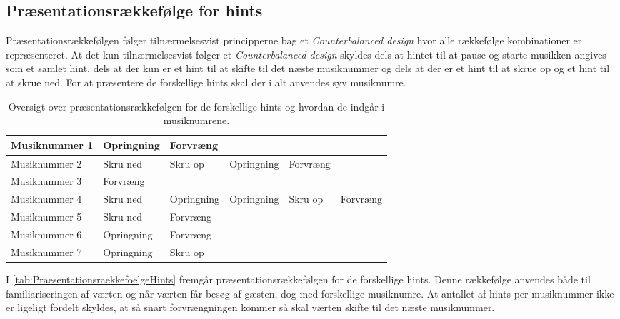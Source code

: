 \subsection{Præsentationsrækkefølge for hints}
\label{PraesentationsraekkefoelgeSocialAccept}
%
Præsentationsrækkefølgen følger tilnærmelsesvist principperne bag et \textit{Counterbalanced design} hvor alle rækkefølge kombinationer er repræsenteret. At det kun tilnærmelsesvist følger et \textit{Counterbalanced design} skyldes dels at hintet til at pause og starte musikken angives som et samlet hint, dels at der kun er et hint til at skifte til det næste musiknummer og dels at der er et hint til at skrue op og et hint til at skrue ned. For at præsentere de forskellige hints skal der i alt anvendes syv musiknumre.
%
\begin{table}[H]
	\centering
	\begin{tabular}{ | p{2.8cm}| p{1.85cm}| p{1.85cm} | p{1.85cm} | p{1.85cm} | p{1.85cm}|}
		\hline
		Musiknummer 1 & Opringning & Forvræng & & & \\ \hline
		Musiknummer 2 & Skru ned & Skru op & Opringning & Forvræng & \\ \hline
		Musiknummer 3 & Forvræng & & & &  \\ \hline
		Musiknummer 4 & Skru ned & Opringning & Opringning & Skru op & Forvræng\\ \hline
		Musiknummer 5 & Skru ned & Forvræng & & & \\ \hline
		Musiknummer 6 & Opringning & Forvræng & & & \\ \hline
		Musiknummer 7 & Opringning & Skru op & & & \\ \hline
	\end{tabular}
	\caption{Oversigt over præsentationsrækkefølgen for de forskellige hints og hvordan de indgår i musiknumrene.}
	\label{tab:PraesentationsraekkefoelgeHints}
\end{table}
\noindent
%
I \autoref{tab:PraesentationsraekkefoelgeHints} fremgår præsentationsrækkefølgen for de forskellige hints. Denne rækkefølge anvendes både til familiariseringen af værten og når værten får besøg af gæsten, dog med forskellige musiknumre. At antallet af hints per musiknummer ikke er ligeligt fordelt skyldes, at så snart forvrængningen kommer så skal værten skifte til det næste musiknummer. 

